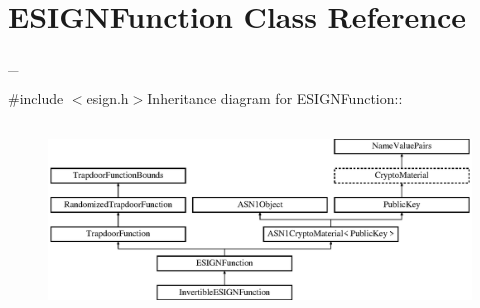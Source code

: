 \hypertarget{class_e_s_i_g_n_function}{
\section{ESIGNFunction Class Reference}
\label{class_e_s_i_g_n_function}
}


\_\-  


{\ttfamily \#include $<$esign.h$>$}Inheritance diagram for ESIGNFunction::\begin{figure}[H]
\begin{center}
\leavevmode
\includegraphics[height=5.13761cm]{class_e_s_i_g_n_function}
\end{center}
\end{figure}
